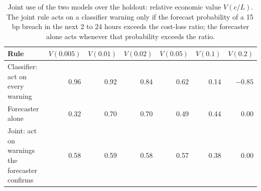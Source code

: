 \begin{table}[pos=!htbp,align=\centering]
\centering
\caption{Joint use of the two models over the holdout: relative economic value $V(c/L)$. The joint rule acts on a classifier warning only if the forecast probability of a 15\,bp breach in the next 2 to 24 hours exceeds the cost-loss ratio; the forecaster alone acts whenever that probability exceeds the ratio.}
\label{tab:cl_joint}
\small
\begin{tabular}{lrrrrrr}
\toprule
Rule & $V(0.005)$ & $V(0.01)$ & $V(0.02)$ & $V(0.05)$ & $V(0.1)$ & $V(0.2)$ \\
\midrule
Classifier: act on every warning & 0.96 & 0.92 & 0.84 & 0.62 & 0.14 & $-0.85$ \\
Forecaster alone & 0.32 & 0.70 & 0.70 & 0.49 & 0.44 & 0.00 \\
Joint: act on warnings the forecaster confirms & 0.58 & 0.59 & 0.58 & 0.57 & 0.38 & 0.00 \\
\bottomrule
\end{tabular}
\end{table}
